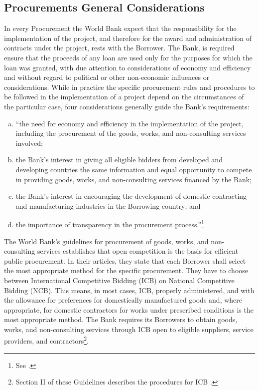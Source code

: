 \subsection{Procurements General Considerations}

In every Procurement the World Bank expect that the responsibility for the implementation of the project, and therefore for the award and administration of contracts under the project, rests with the Borrower. The Bank, is required ensure that the proceeds of any loan are used only for the purposes for which the loan was granted, with due attention to considerations of economy and efficiency and without regard to political or other non-economic influences or considerations. While in practice the specific procurement rules and procedures to be followed in the implementation of a project depend on the circumstances of the particular case, four considerations generally guide the Bank's requirements:
\begin{enumerate}[a)]
\item ``the need for economy and efficiency in the implementation of the project, including the procurement of the goods, works, and non-consulting services involved;
\item the Bank's interest in giving all eligible bidders from developed and developing countries the same information and equal opportunity to compete in providing goods, works, and non-consulting services financed by the Bank;
\item  the Bank's interest in encouraging the development of domestic contracting and manufacturing industries in the Borrowing country; and
\item the importance of transparency in the procurement process.''\footnote{See \cite{wb_g_proc}.}
\end{enumerate}

The World Bank's guidelines for procurement of goods, works, and non-consulting services \parencite{wb_g_proc} establishes that open competition is the basis for efficient public procurement.  In their articles, they state that each Borrower shall select the most appropriate method for the specific procurement. They have to choose between International Competitive Bidding (ICB) on National Competitive Bidding (NCB). This means, in most cases, ICB, properly administered, and with the allowance for preferences for domestically manufactured goods and, where appropriate, for domestic contractors for works under prescribed conditions is the most appropriate method. The Bank requires its Borrowers to obtain goods, works, and non-consulting services through ICB open to eligible suppliers, service providers, and contractors\footnote{Section II of these Guidelines describes the procedures for ICB \parencite{wb_g_proc}.}.

